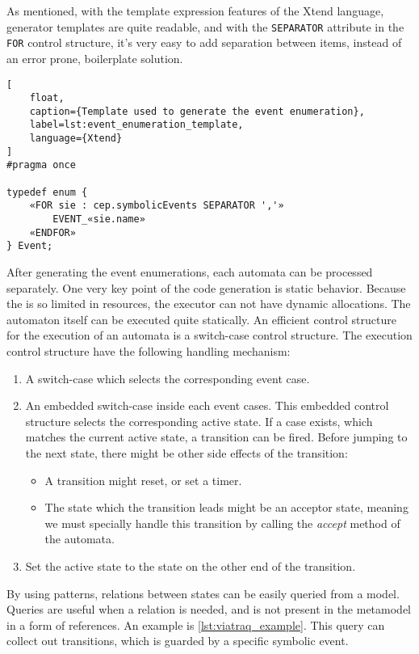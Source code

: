As mentioned, with the template expression features of the Xtend language, generator templates are quite readable, and with the \texttt{SEPARATOR} attribute in the \texttt{FOR} control structure, it's very easy to add separation between items, instead of an error prone, boilerplate solution.

\begin{lstlisting}[
	float,
	caption={Template used to generate the event enumeration},
	label=lst:event_enumeration_template,
	language={Xtend}
]
#pragma once

typedef enum {
	«FOR sie : cep.symbolicEvents SEPARATOR ','»
		EVENT_«sie.name»
	«ENDFOR»
} Event;
\end{lstlisting}

\needspace{5ex}
After generating the event enumerations, each automata can be processed separately. One very key point of the \cpp{} code generation is static behavior. Because the \pru{} is so limited in resources, the executor can not have dynamic allocations. The automaton itself can be executed quite statically. An efficient control structure for the execution of an automata is a switch-case control structure. The execution control structure have the following handling mechanism:
\begin{enumerate}
	\item A switch-case which selects the corresponding event case.
	\item An embedded switch-case inside each event cases. This embedded control structure selects the corresponding active state. If a case exists, which matches the current active state, a transition can be fired. Before jumping to the next state, there might be other side effects of the transition:
	\begin{itemize}
		\item A transition might reset, or set a timer.
		\item The state which the transition leads might be an acceptor state, meaning we must specially handle this transition by calling the \emph{accept} method of the automata.
	\end{itemize}
	\item Set the active state to the state on the other end of the transition.
\end{enumerate}

By using \viatraq{} patterns, relations between states can be easily queried from a model. Queries are useful when a relation is needed, and is not present in the metamodel in a form of references. An example is \cref{lst:viatraq_example}. This query can collect out transitions, which is guarded by a specific symbolic event.

